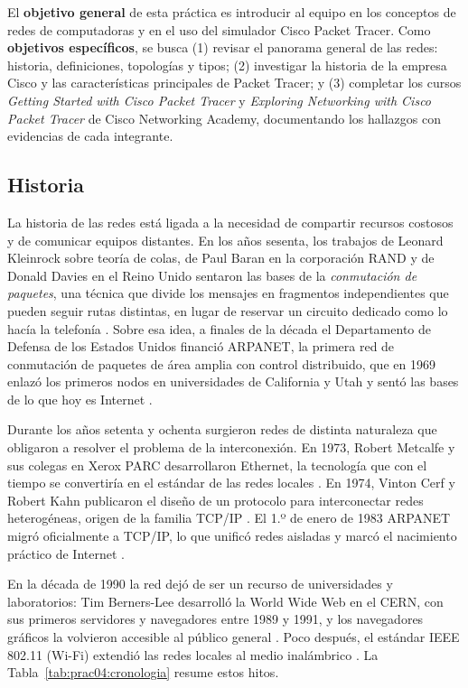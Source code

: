 El \textbf{objetivo general} de esta práctica es introducir al equipo en los conceptos de redes de computadoras y en el uso del simulador Cisco Packet Tracer. Como \textbf{objetivos específicos}, se busca (1) revisar el panorama general de las redes: historia, definiciones, topologías y tipos; (2) investigar la historia de la empresa Cisco y las características principales de Packet Tracer; y (3) completar los cursos \emph{Getting Started with Cisco Packet Tracer} y \emph{Exploring Networking with Cisco Packet Tracer} de Cisco Networking Academy, documentando los hallazgos con evidencias de cada integrante.

\subsection{Historia}
\label{sec:prac04:historia-redes}

La historia de las redes está ligada a la necesidad de compartir recursos costosos y de comunicar equipos distantes. En los años sesenta, los trabajos de Leonard Kleinrock sobre teoría de colas, de Paul Baran en la corporación RAND y de Donald Davies en el Reino Unido sentaron las bases de la \emph{conmutación de paquetes}, una técnica que divide los mensajes en fragmentos independientes que pueden seguir rutas distintas, en lugar de reservar un circuito dedicado como lo hacía la telefonía \cite{kurose:computer-networking:2017}. Sobre esa idea, a finales de la década el Departamento de Defensa de los Estados Unidos financió ARPANET, la primera red de conmutación de paquetes de área amplia con control distribuido, que en 1969 enlazó los primeros nodos en universidades de California y Utah y sentó las bases de lo que hoy es Internet \cite{tanenbaum:computer-networks:2021, stallings:data-computer-comm:2014}.

Durante los años setenta y ochenta surgieron redes de distinta naturaleza que obligaron a resolver el problema de la interconexión. En 1973, Robert Metcalfe y sus colegas en Xerox PARC desarrollaron Ethernet, la tecnología que con el tiempo se convertiría en el estándar de las redes locales \cite{kurose:computer-networking:2017}. En 1974, Vinton Cerf y Robert Kahn publicaron el diseño de un protocolo para interconectar redes heterogéneas, origen de la familia TCP/IP \cite{cerf:tcp:1974}. El 1.º de enero de 1983 ARPANET migró oficialmente a TCP/IP, lo que unificó redes aisladas y marcó el nacimiento práctico de Internet \cite{tanenbaum:computer-networks:2021}.

En la década de 1990 la red dejó de ser un recurso de universidades y laboratorios: Tim Berners-Lee desarrolló la World Wide Web en el CERN, con sus primeros servidores y navegadores entre 1989 y 1991, y los navegadores gráficos la volvieron accesible al público general \cite{forouzan:data-comm-networking:2013, kurose:computer-networking:2017}. Poco después, el estándar IEEE 802.11 (Wi-Fi) extendió las redes locales al medio inalámbrico \cite{tanenbaum:computer-networks:2021}. La Tabla~\ref{tab:prac04:cronologia} resume estos hitos.

